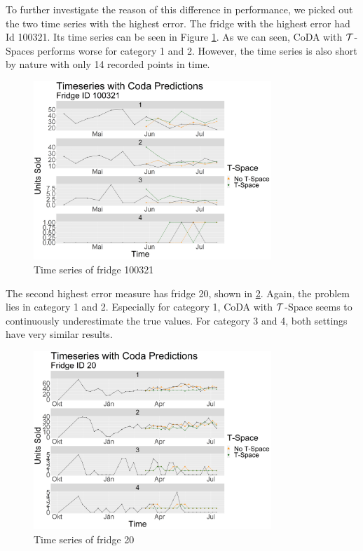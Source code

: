 To further investigate the reason of this difference in performance, we picked out the two time series with the highest error. The fridge with the highest error had Id 100321. Its time series can be seen in Figure \ref{fig:Coda_Timeseries_VariationtSpace100321}. As we can seen, CoDA with $\mathcal{T}$-Spaces performs worse for category 1 and 2. However, the time series is also short by nature with only 14 recorded points in time.  

\begin{figure}[htbp]
	\centering
		\includegraphics[width=0.80\textwidth]{Graphiken/Coda_Timeseries_VariationtSpace100321.png}
	\caption{Time series of fridge 100321}
	\label{fig:Coda_Timeseries_VariationtSpace100321}
\end{figure}

The second highest error measure has fridge 20, shown in \ref{fig:Coda_Timeseries_VariationtSpace20}. Again, the problem lies in category 1 and 2. Especially for category 1, CoDA with $\mathcal{T}$-Space seems to continuously underestimate the true values. For category 3 and 4, both settings have very similar results.

\begin{figure}[htbp]
	\centering
		\includegraphics[width=0.80\textwidth]{Graphiken/Coda_Timeseries_VariationtSpace20.png}
	\caption{Time series of fridge 20}
	\label{fig:Coda_Timeseries_VariationtSpace20}
\end{figure}

